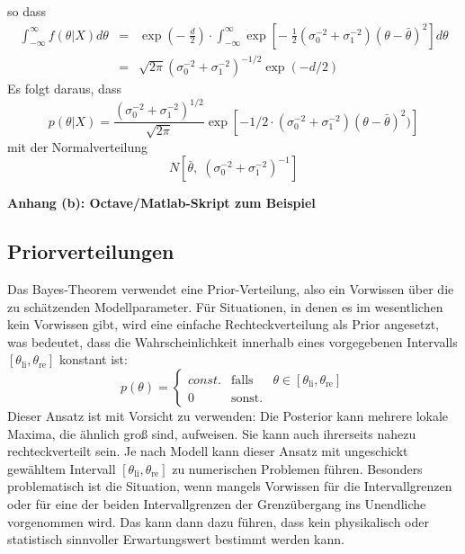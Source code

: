 so dass
\begin{equation}
\begin{array}{rcl}
\int_{-\infty}^{\infty} f(\theta|X) d \theta & = &
\exp \left( -\; \frac{d}{2} \right) \cdot \int_{-\infty}^{\infty}
\exp \left[ - \; \frac{1}{2} (\sigma_0^{-2}+ \sigma_1^{-2})(\theta - \bar{\theta})^2
\right] d \theta \\
&=& \sqrt{2 \pi} (\sigma_0^{-2}+\sigma_1^{-2})^{-1/2} \exp (-d/2)
\end{array}
\end{equation}
Es folgt daraus, dass
\begin{equation}
p(\theta|X) = \frac{(\sigma_0^{-2}+\sigma_1^{-2})^{1/2}}{\sqrt{2\pi}}
\exp \left[- 1/2 \cdot (\sigma_0^{-2}+\sigma_1^{-2})(\theta-\bar{\theta})^2)\right]
\end{equation}
mit der Normalverteilung
\begin{equation}
N\left[\bar{\theta}, \; (\sigma_0^{-2} + \sigma_1^{-2})^{-1} \right]
\end{equation}

\newpage
\textbf{Anhang (b): Octave/Matlab-Skript zum Beispiel}


\newpage
\subsection{Priorverteilungen}
Das Bayes-Theorem verwendet eine Prior-Verteilung, also ein Vorwissen über die zu schätzenden Modellparameter.
Für Situationen, in denen es im wesentlichen kein Vorwissen gibt, wird eine einfache Rechteckverteilung als Prior angesetzt, was bedeutet, dass die Wahrscheinlichkeit innerhalb eines vorgegebenen Intervalls $[\theta_\mathrm{li},\theta_\mathrm{re}]$ konstant ist:
\[
p(\theta) = \left\{\begin{array}{lll}
const. & \textrm{falls} & \theta \in [\theta_\mathrm{li},\theta_\mathrm{re}]\\
0 & \textrm{sonst.} &
\end{array}\right.
\]
Dieser Ansatz ist mit Vorsicht zu verwenden:
Die Posterior kann mehrere lokale Maxima, die ähnlich groß sind, aufweisen.
Sie kann auch ihrerseits nahezu rechteckverteilt sein.
Je nach Modell kann dieser Ansatz mit ungeschickt gewähltem Intervall
$[\theta_\mathrm{li},\theta_\mathrm{re}]$ zu numerischen Problemen führen.
Besonders problematisch ist die Situation, wenn mangels Vorwissen für die Intervallgrenzen
oder für eine der beiden Intervallgrenzen der Grenzübergang ins Unendliche vorgenommen wird.
Das kann dann dazu führen, dass kein physikalisch oder statistisch sinnvoller
Erwartungswert bestimmt werden kann.

